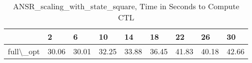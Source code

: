 \begin{table}
\centering
\caption{ANSR\_scaling\_with\_state\_square, Time in Seconds to Compute CTL}
\label{ANSR_scaling_with_state_square_CTL_time}
\begin{tabular}{lllllllll}
\toprule
{} &      2 &      6 &     10 &     14 &     18 &     22 &     26 &     30 \\
\midrule
full\textbackslash \_opt &  30.06 &  30.01 &  32.25 &  33.88 &  36.45 &  41.83 &  40.18 &  42.66 \\
\bottomrule
\end{tabular}
\end{table}
